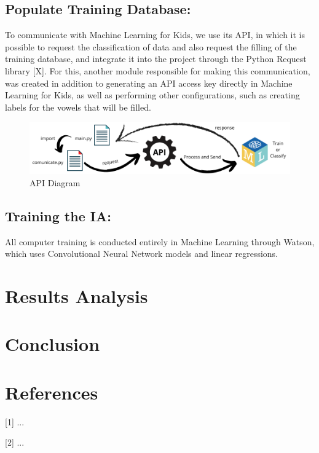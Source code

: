\documentclass[a4paper, 12pt]{article}
\begin{document}
\subsection{Populate Training Database:}
To communicate with Machine Learning for Kids, we use its API, in which it is possible to request the classification of data and also request the filling of the training database, and integrate it into the project through the Python Request library [X]. For this, another module responsible for making this communication, was created in addition to generating an API access key directly in Machine Learning for Kids, as well as performing other configurations, such as creating labels for the vowels that will be filled.

 \begin{figure}[!ht]
\centering
\includegraphics[scale=0.5]{api_diagram.png}
\caption{API Diagram}
\label{figure_5}
\end{figure}





\subsection{Training the IA:}
All computer training is conducted entirely in Machine Learning through Watson, which uses Convolutional Neural Network models and linear regressions.





\newpage
\section{Results Analysis}



\section{Conclusion}





\newpage
\section{References}

[1] ...

[2] ...
\end{document}
